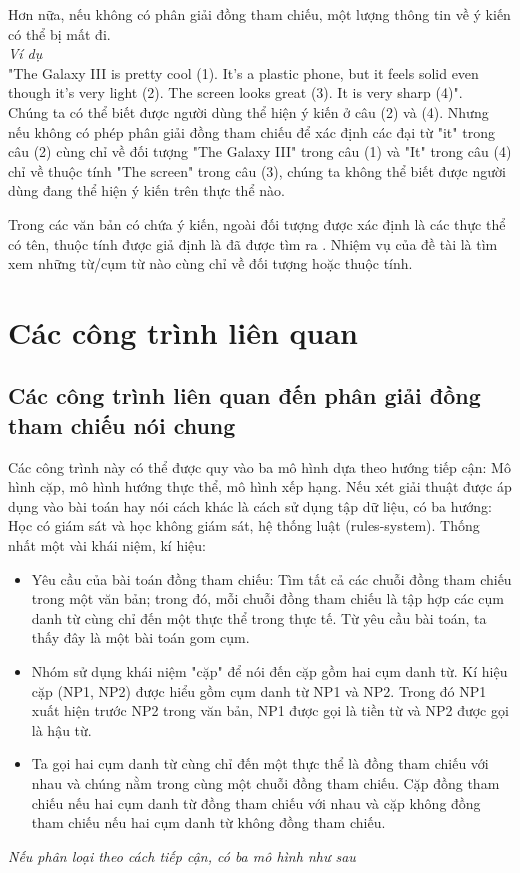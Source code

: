 \documentclass[12pt]{extarticle}
\begin{document}
		\par Hơn nữa, nếu không có phân giải đồng tham chiếu, một lượng thông tin về ý kiến có thể bị mất đi.\\
		\textit{Ví dụ}\\
		"The Galaxy III is pretty cool (1). It's a plastic phone, but it feels solid even though it's very light (2). The screen looks great (3). It is very sharp (4)".
		\\Chúng ta có thể biết được người dùng thể hiện ý kiến ở câu (2) và (4). Nhưng nếu không có phép phân giải đồng tham chiếu để xác định các đại từ "it" trong câu (2) cùng chỉ về đối tượng "The Galaxy III" trong câu (1) và "It" trong câu (4) chỉ về thuộc tính "The screen" trong câu (3), chúng ta không thể biết được người dùng đang thể hiện ý kiến trên thực thể nào.
		\par Trong các văn bản có chứa ý kiến, ngoài đối tượng được xác định là các thực thể có tên, thuộc tính được giả định là đã được tìm ra \cite{findfeatures1} \cite{findfeatures2}. Nhiệm vụ của đề tài là tìm xem những từ/cụm từ nào cùng chỉ về đối tượng hoặc thuộc tính.			

	\section{Các công trình liên quan}
		\subsection{Các công trình liên quan đến phân giải đồng tham chiếu nói chung}
			\par Các công trình này có thể được quy vào ba mô hình dựa theo hướng tiếp cận: Mô hình cặp, mô hình hướng thực thể, mô hình xếp hạng. Nếu xét giải thuật được áp dụng vào bài toán hay nói cách khác là cách sử dụng tập dữ liệu, có ba hướng: Học có giám sát và học không giám sát, hệ thống luật (rules-system). 
			Thống nhất một vài khái niệm, kí hiệu:
				\begin{itemize}
					\item{Yêu cầu của bài toán đồng tham chiếu: Tìm tất cả các chuỗi đồng tham chiếu trong một văn bản; trong đó, mỗi chuỗi đồng tham chiếu là tập hợp các cụm danh từ cùng chỉ đến một thực thể trong thực tế. Từ yêu cầu bài toán, ta thấy đây là một bài toán gom cụm.} 
					\item{Nhóm sử dụng khái niệm "cặp" để nói đến cặp gồm hai cụm danh từ. Kí hiệu cặp (NP1, NP2) được hiểu gồm cụm danh từ NP1 và NP2. Trong đó NP1 xuất hiện trước NP2 trong văn bản, NP1 được gọi là tiền từ và NP2 được gọi là hậu từ.}
					\item{Ta gọi hai cụm danh từ cùng chỉ đến một thực thể là đồng tham chiếu với nhau và chúng nằm trong cùng một chuỗi đồng tham chiếu. Cặp đồng tham chiếu nếu hai cụm danh từ đồng tham chiếu với nhau và cặp không đồng tham chiếu nếu hai cụm danh từ không đồng tham chiếu.}
				\end{itemize}
			\par \textit{Nếu phân loại theo cách tiếp cận, có ba mô hình như sau}
\end{document}
